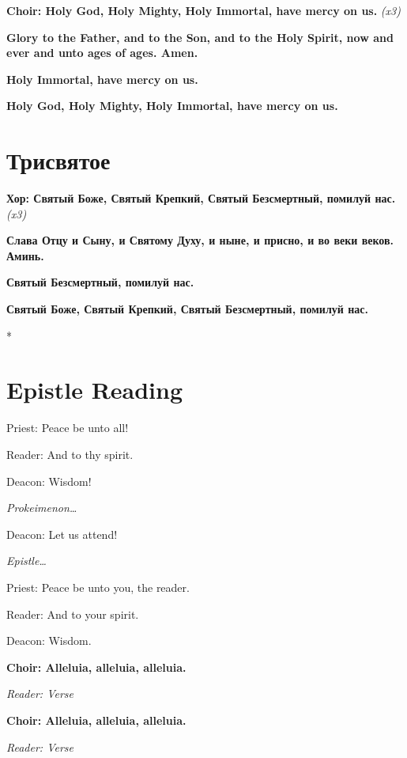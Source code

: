 \documentclass[12pt,a4paper,titlepage]{report}
\begin{document}
\begin{paracol}[1]{2}
  \textbf{Choir: Holy God, Holy Mighty, Holy Immortal, have mercy on us. } \textit{(x3)}

  \textbf{Glory to the Father, and to the Son, and to the Holy Spirit, now and ever and unto ages of ages. Amen.}

  \textbf{Holy Immortal, have mercy on us.}

  \textbf{Holy God, Holy Mighty, Holy Immortal, have mercy on us.}

  \switchcolumn[1]

  \section*{Трисвятое}
  \textbf{Хор: Святый Боже, Святый Крепкий, Святый Безсмертный, помилуй нас. } \foreignlanguage{english}{\textit{(x3)}}

  \textbf{Слава Отцу и Сыну, и Святому Духу, и ныне, и присно, и во веки веков. Аминь.}

  \textbf{Святый Безсмертный, помилуй нас.}

  \textbf{Святый Боже, Святый Крепкий, Святый Безсмертный, помилуй нас.}

  \switchcolumn[0]*

  \section*{Epistle Reading}

  Priest: Peace be unto all!

  Reader: And to thy spirit.

  Deacon: Wisdom!

  \medskip
  \indent \textit{Prokeimenon\ldots}
  \medskip

  Deacon: Let us attend!

  \medskip
  \indent \textit{Epistle\ldots}
  \medskip

  Priest: Peace be unto you, the reader.

  Reader: And to your spirit.

  Deacon: Wisdom.

  \textbf{Choir: Alleluia, alleluia, alleluia.}

  \textit{Reader: Verse}

  \textbf{Choir: Alleluia, alleluia, alleluia.}

  \textit{Reader: Verse}


\end{paracol}
\end{document}
